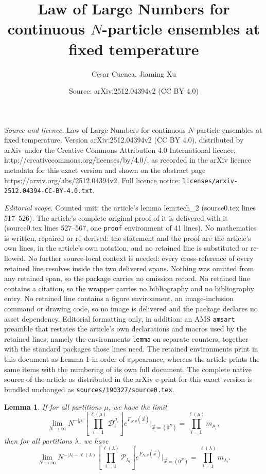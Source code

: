 \documentclass[10pt,a4paper]{amsart}
\title{Law of Large Numbers for continuous $N$-particle ensembles at fixed temperature}
\author{Cesar Cuenca, Jiaming Xu}
\date{Source: arXiv:2512.04394v2 (CC BY 4.0)}
\newtheorem{lemma}{Lemma}
\newcommand{\D}{\mathcal D}
\renewcommand{\P}{\mathcal P}
\newcommand{\la}{\lambda}
\newcommand{\vecx}{\vec{x}}
\begin{document}
\maketitle

\noindent\emph{Source and licence.} Law of Large Numbers for continuous $N$-particle ensembles at fixed temperature. Version arXiv:2512.04394v2 (CC BY 4.0), distributed by arXiv under the Creative Commons Attribution 4.0 International licence, http://creativecommons.org/licenses/by/4.0/, as recorded in the arXiv licence metadata for this exact version and shown on the abstract page https://arxiv.org/abs/2512.04394v2. Full licence notice: \texttt{licenses/arxiv-2512.04394-CC-BY-4.0.txt}.\par\smallskip

\noindent\textit{Editorial scope.} Counted unit: the article's lemma lem:tech\_2 (source0.tex lines 517--526). The article's complete original proof of it is delivered with it (source0.tex lines 527--567, one \texttt{proof} environment of 41 lines). No mathematics is written, repaired or re-derived: the statement and the proof are the article's own lines, in the article's own notation, and no retained line is substituted or re-flowed.  No further source-local context is needed: every cross-reference of every retained line resolves inside the two delivered spans.  Nothing was omitted from any retained span, so the package carries no omission record.  No retained line contains a citation, so the wrapper carries no bibliography and no bibliography entry.  No retained line contains a figure environment, an image-inclusion command or drawing code, so no image is delivered and the package declares no asset dependency.  Editorial formatting only, in addition: an AMS \texttt{amsart} preamble that restates the article's own declarations and macros used by the retained lines, namely the environments \texttt{lemma} on separate counters, together with the standard packages those lines need.  The retained environments print in this document as Lemma 1 in order of appearance, whereas the article prints the same items with the numbering of its own full document.  The complete native source of the article as distributed in the arXiv e-print for this exact version is bundled unchanged as \texttt{sources/190327/source0.tex}.
\begin{lemma}\label{lem:tech_2}
    If for all partitions $\mu$, we have the limit
    \begin{equation}\label{eq:assumption_tech_2}
    \lim_{N\to\infty}{ N^{-|\mu|}\left[ \prod_{i=1}^{\ell(\mu)}{\D_i^{\mu_i}} \right] e^{F_{N,\theta}(\vecx)} \bigg|_{\vecx=(0^N)} } = \prod_{i=1}^{\ell(\mu)}{m_{\mu_i}},
    \end{equation}
    then for all partitions $\la$, we have
    \begin{equation}\label{eq:conclusion_tech_2}
    \lim_{N\to\infty} N^{-|\la|-\ell(\la)}\left[ \prod_{i=1}^{\ell(\la)}{\P_{\la_i}} \right] e^{F_{N,\theta}(\vecx)} \bigg|_{\vecx=(0^N)} = \prod_{i=1}^{\ell(\la)}{m_{\la_i}}.
    \end{equation}
\end{lemma}
\end{document}
